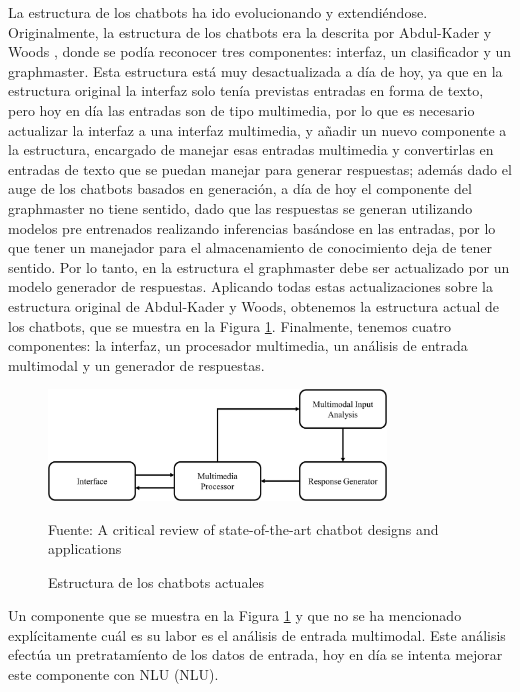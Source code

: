 La estructura de los chatbots ha ido evolucionando y extendiéndose. Originalmente, la estructura de los chatbots era la descrita por Abdul-Kader y Woods \cite{RefWorks:RefID:36-luo2022critical}, donde se podía reconocer tres componentes: interfaz, un clasificador y un graphmaster. Esta estructura está muy desactualizada a día de hoy, ya que en la estructura original la interfaz solo tenía previstas entradas en forma de texto, pero hoy en día las entradas son de tipo multimedia, por lo que es necesario actualizar la interfaz a una interfaz multimedia, y añadir un nuevo componente a la estructura, encargado de manejar esas entradas multimedia y convertirlas en entradas de texto que se puedan manejar para generar respuestas; además dado el auge de los chatbots basados en generación, a día de hoy el componente del graphmaster no tiene sentido, dado que las respuestas se generan utilizando modelos pre entrenados realizando inferencias basándose en las entradas, por lo que tener un manejador para el almacenamiento de conocimiento deja de tener sentido. Por lo tanto, en la estructura el graphmaster debe ser actualizado por un modelo generador de respuestas. Aplicando todas estas actualizaciones sobre la estructura original de Abdul-Kader y Woods, obtenemos la estructura actual de los chatbots, que se muestra en la Figura \ref{fig:estructura_state_of_art}. Finalmente, tenemos cuatro componentes: la interfaz, un procesador multimedia, un análisis de entrada multimodal y un generador de respuestas.

\begin{figure}[h]
\centering
\includegraphics[width=0.8\textwidth]{imagenes/02_EstadoDelArte/estructura_state_of_art.jpg}
\begin{center}
Fuente: A critical review of state-of-the-art chatbot designs and applications \cite{RefWorks:RefID:36-luo2022critical}
\end{center}
\caption{Estructura de los chatbots actuales}
\label{fig:estructura_state_of_art}
\end{figure}

Un componente que se muestra en la Figura \ref{fig:estructura_state_of_art} y que no se ha mencionado explícitamente cuál es su labor es el análisis de entrada multimodal. Este análisis efectúa un pretratamíento de los datos de entrada, hoy en día se intenta mejorar este componente con \gls{NLU} (NLU).

